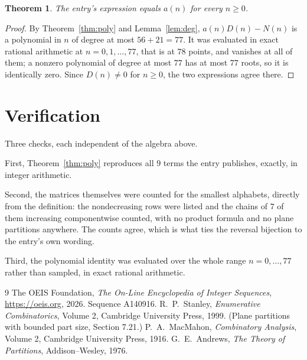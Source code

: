 \documentclass[11pt,a4paper]{article}
\theoremstyle{plain}
\newtheorem{theorem}{Theorem}
\theoremstyle{definition}
\begin{document}
\begin{theorem}
The entry's expression equals $a(n)$ for every $n\ge0$.
\end{theorem}

\begin{proof}
By Theorem~\ref{thm:poly} and Lemma~\ref{lem:deg}, $a(n)D(n)-N(n)$ is a polynomial in $n$
of degree at most $56+21=77$. It was evaluated in exact rational arithmetic at
$n=0,1,\dots,77$, that is at $78$ points, and vanishes at all of them; a nonzero polynomial
of degree at most $77$ has at most $77$ roots, so it is identically zero. Since $D(n)\neq0$
for $n\ge0$, the two expressions agree there.
\end{proof}

\section{Verification}

Three checks, each independent of the algebra above.

First, Theorem~\ref{thm:poly} reproduces all $9$ terms the entry publishes,
exactly, in integer arithmetic.

Second, the matrices themselves were counted for the smallest alphabets, directly from the
definition: the nondecreasing rows were listed and the chains of $7$ of them increasing
componentwise counted, with no product formula and no plane partitions anywhere. The counts
agree, which is what ties the reversal bijection to the entry's own wording.

Third, the polynomial identity was evaluated over the whole range $n=0,\dots,77$ rather than
sampled, in exact rational arithmetic.

\begin{thebibliography}{9}
 The OEIS Foundation, \emph{The On-Line Encyclopedia of Integer
Sequences}, \url{https://oeis.org}, 2026. Sequence A140916.
 R.~P.~Stanley, \emph{Enumerative Combinatorics}, Volume 2, Cambridge
University Press, 1999. (Plane partitions with bounded part size, Section 7.21.)
 P.~A.~MacMahon, \emph{Combinatory Analysis}, Volume 2, Cambridge
University Press, 1916.
 G.~E.~Andrews, \emph{The Theory of Partitions}, Addison--Wesley, 1976.
\end{thebibliography}
\end{document}
